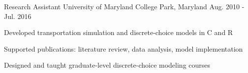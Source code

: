 \begin{cventries}
\cventry
{Research Assistant} %
{University of Maryland} %
{College Park, Maryland} %
{Aug. 2010 - Jul. 2016} %
{
  \begin{cvitems} %
    \item{Developed transportation simulation and discrete-choice models in C and R}
    \item{Supported publications: literature review, data analysis, model implementation}
    \item{Designed and taught graduate-level discrete-choice modeling courses}
\end{cvitems}
}

\end{cventries}
